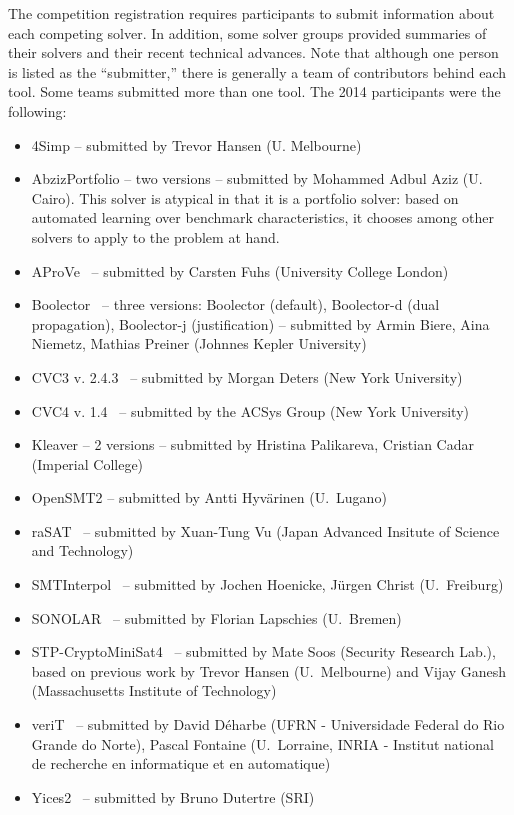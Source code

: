 \documentclass[twoside,11pt]{article}
\begin{document}
The competition registration requires participants to submit information about each competing solver. In addition, some solver groups provided summaries of their solvers and their recent technical advances.
 Note that although one person is listed as the ``submitter,'' there is generally a team of contributors behind each tool. Some teams submitted more than one tool. The 2014 participants were the following:
\begin{itemize}
\item 4Simp -- submitted by Trevor Hansen (U. Melbourne)
\item AbzizPortfolio -- two versions -- submitted by Mohammed Adbul Aziz (U. Cairo). This solver is atypical in that it is a portfolio solver: based on automated learning over benchmark characteristics, it chooses among other solvers to apply to the problem at hand.
\item AProVe~\cite{AProVE2014} -- submitted by Carsten Fuhs (University College London)
\item Boolector~\cite{Boolector2015} -- three versions: Boolector (default),  Boolector-d (dual propagation), Boolector-j (justification) -- submitted by Armin Biere, Aina Niemetz, Mathias Preiner (Johnnes Kepler University)
\item CVC3 v. 2.4.3~\cite{BT07} -- submitted by Morgan Deters (New York University)
\item CVC4 v. 1.4~\cite{BCD+11} -- submitted by the ACSys Group (New York University)
\item Kleaver -- 2 versions -- submitted by Hristina Palikareva, Cristian Cadar (Imperial College)
\item OpenSMT2 -- submitted by Antti Hyv\"arinen (U.~Lugano)
\item raSAT~\cite{DBLP:conf/smt/KhanhVO14} -- submitted by Xuan-Tung Vu (Japan Advanced Insitute of Science and Technology)
\item SMTInterpol~\cite{DBLP:conf/spin/ChristHN12,DBLP:conf/spin/2012} -- submitted by Jochen Hoenicke, J\"urgen Christ (U.~Freiburg)
\item SONOLAR~\cite{Peleska:2011:ATC:1986308.1986333} -- submitted by Florian Lapschies (U.~Bremen)
\item STP-CryptoMiniSat4~\cite{DBLP:conf/cav/GaneshD07,DBLP:conf/cav/2007} -- submitted by Mate Soos (Security Research Lab.), based on previous work by Trevor Hansen (U.~Melbourne) and Vijay Ganesh (Massachusetts Institute of Technology)
\item veriT~\cite{veriT} -- submitted by David D\'{e}harbe (UFRN - Universidade Federal do Rio Grande do Norte), Pascal Fontaine (U.~Lorraine, INRIA - Institut national de recherche en informatique et en automatique)
\item Yices2~\cite{Dutertre:cav2014} -- submitted by Bruno Dutertre (SRI)
\end{itemize}
\end{document}
